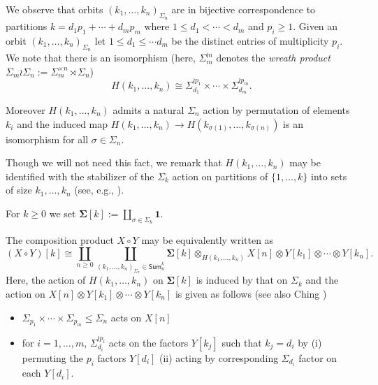 \begin{remark} 
    We observe that orbits $(k_1,\dots,k_n)_{\Sigma_n}$ are in bijective correspondence to partitions $k=d_1p_1+\cdots+d_mp_m$ where $1\leq d_1<\cdots<d_m$ and $p_i\geq 1$. Given an orbit $(k_1,\dots,k_n)_{\Sigma_n}$ let $1\leq d_1\leq \cdots d_m$ be the distinct entries of multiplicity $p_i$. We note that there is an isomorphism (here, $\Sigma_m^{\wr n}$ denotes the \textit{wreath product} $\Sigma_m\wr \Sigma_n :=\Sigma_m^{\times n}\rtimes \Sigma_n$)
    \[H(k_1,\dots,k_n)\cong \Sigma_{d_1}^{\wr p_1}\times\cdots \times \Sigma_{d_m}^{\wr p_m}.\] 
    
    Moreover $H(k_1,\dots,k_n)$ admits a natural $\Sigma_n$ action by permutation of elements $k_i$ and the induced map $H(k_1,\dots,k_n) \to H(k_{\sigma(1)},\dots, k_{\sigma(n)})$ is an isomorphism for all $\sigma\in \Sigma_n$.\end{remark} 
    
    Though we will not need this fact, we remark that $H(k_1,\dots,k_n)$ may be identified with the stabilizer of the $\Sigma_k$ action on partitions of $\{1,\dots,k\}$ into sets of size $k_1,\dots,k_n$ (see, e.g.,  \cite[]{Ching-chain-rule}).

For $k\geq 0$ we set $\mathbf{\Sigma}[k]:=\coprod_{\sigma\in \Sigma_k} \mathbf{1}$.

\begin{remark} The composition product $X\circ Y$ may be equivalently written as \begin{equation} \label{comp-prod-def-orb} 
    (X{\circ} Y)[k]\cong \coprod_{n\geq 0} \coprod_{(k_1,\dots,k_n)_{\Sigma_n}\in \mathsf{Sum}_n^k} \mathbf{\Sigma}[k] \otimes_{H(k_1,\dots,k_n)} X[n] \otimes Y[k_1]\otimes \cdots \otimes Y[k_n].
\end{equation}
Here, the  action of $H(k_1,\dots,k_n)$ on $\mathbf{\Sigma}[k]$ is induced by that on $\Sigma_k$ and the action on $X[n]\otimes Y[k_1] \otimes \cdots \otimes Y[k_n]$ is given as follows (see also Ching \cite[1.13]{Ching-chain-rule})
\begin{itemize}
    \item $\Sigma_{p_1}\times \cdots \times \Sigma_{p_m}\leq \Sigma_n$ acts on $X[n]$ 
    \item for $i=1,\dots,m$, $\Sigma_{d_i}^{\wr p_i}$ acts on the factors $Y[k_j]$ such that $k_j=d_i$ by
    \subitem (i) permuting the $p_i$ factors $Y[d_i]$  
    \subitem (ii) acting by corresponding $\Sigma_{d_i}$ factor on each $Y[d_i]$. 
\end{itemize}
\end{remark}

